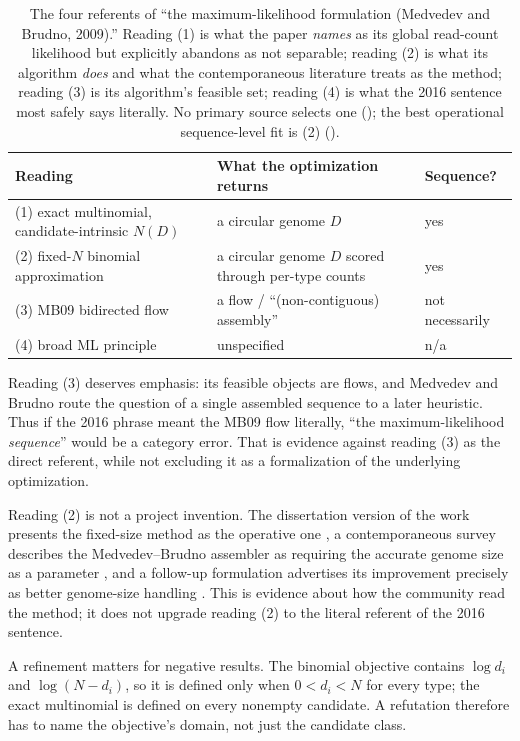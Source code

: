 \begin{table}[!htbp]
\centering
\small
\begin{tabular}{@{}p{}p{}p{}@{}}
\toprule
Reading & What the optimization returns & Sequence? \\
\midrule
(1) exact multinomial, candidate-intrinsic $N(D)$
  & a circular genome $D$
  & yes \\
(2) fixed-$N$ binomial approximation
  & a circular genome $D$ scored through per-type counts
  & yes \\
(3) MB09 bidirected flow
  & a flow / ``(non-contiguous) assembly''
  & not necessarily \\
(4) broad ML principle
  & unspecified
  & n/a \\
\bottomrule
\end{tabular}
\caption{The four referents of ``the maximum-likelihood formulation
(Medvedev and Brudno, 2009).'' Reading (1) is what the paper \emph{names} as its
global read-count likelihood but explicitly abandons as not separable;
reading (2) is what its algorithm \emph{does} and what the contemporaneous
literature treats as the method; reading (3) is its algorithm's feasible set;
reading (4) is what the 2016 sentence most safely says literally. No primary
source selects one (\srcfact); the best operational sequence-level fit is (2)
(\srcinf).}
\label{tab:referents}
\end{table}

Reading (3) deserves emphasis: its feasible objects are flows, and Medvedev and
Brudno route the question of a single assembled sequence to a later heuristic.
Thus if the 2016 phrase meant the MB09 flow literally, ``the
maximum-likelihood \emph{sequence}'' would be a category error. That is evidence
against reading (3) as the direct referent, while not excluding it as a
formalization of the underlying optimization.

Reading (2) is not a project invention. The dissertation version of the work
presents the fixed-size method as the operative one \parencite{medvedev2010}, a
contemporaneous survey describes the Medvedev--Brudno assembler as requiring the
accurate genome size as a parameter \parencite{howison2013}, and a follow-up
formulation advertises its improvement precisely as better genome-size handling
\parencite{varma2011}. This is evidence about how the community read the method; it
does not upgrade reading (2) to the literal referent of the 2016 sentence.

A refinement matters for negative results. The binomial objective contains
$\log d_i$ and $\log(N-d_i)$, so it is defined only when $0<d_i<N$ for every
type; the exact multinomial is defined on every nonempty candidate. A refutation
therefore has to name the objective's domain, not just the candidate class.


